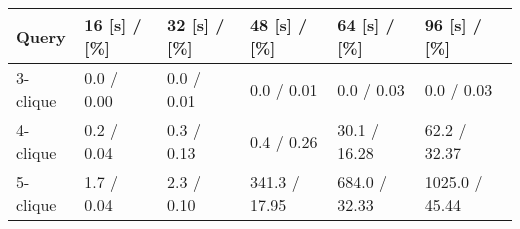 \begin{tabular}{llllll}
\toprule
    Query & 16 [s] / [\%] & 32 [s] / [\%] &   48 [s] / [\%] &   64 [s] / [\%] &    96 [s] / [\%] \\
\midrule
 3-clique &   0.0 / 0.00 &   0.0 / 0.01 &     0.0 / 0.01 &     0.0 / 0.03 &      0.0 / 0.03 \\
 4-clique &   0.2 / 0.04 &   0.3 / 0.13 &     0.4 / 0.26 &   30.1 / 16.28 &    62.2 / 32.37 \\
 5-clique &   1.7 / 0.04 &   2.3 / 0.10 &  341.3 / 17.95 &  684.0 / 32.33 &  1025.0 / 45.44 \\
\bottomrule
\end{tabular}
